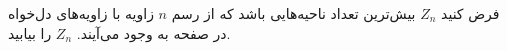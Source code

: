     \p 
    فرض کنید
$Z_n$
بیش‌ترین تعداد ناحیه‌هایی باشد که از رسم
$n$
زاویه با زاویه‌های دل‌خواه در صفحه به وجود می‌آیند.
$Z_n$
را بیابید.